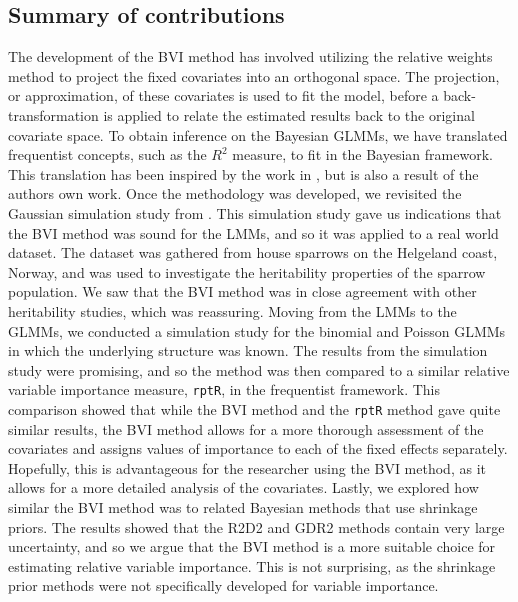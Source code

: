 \subsection*{Summary of contributions}
The development of the BVI method has involved utilizing the relative weights method \citep{johnson_relative_weights} to project the fixed covariates into an orthogonal space. The projection, or approximation, of these covariates is used to fit the model, before a back-transformation is applied to relate the estimated results back to the original covariate space. To obtain inference on the Bayesian GLMMs, we have translated frequentist concepts, such as the $R^2$ measure, to fit in the Bayesian framework. This translation has been inspired by the work in \citet{gelman2017rsquared}, but is also a result of the authors own work. 
Once the methodology was developed, we revisited the Gaussian simulation study from \citet{Arnstad:Relative_variable_importance_in_Bayesian_linear_mixed_models:2024}. This simulation study gave us indications that the BVI method was sound for the LMMs, and so it was applied to a real world dataset. The dataset was gathered from house sparrows on the Helgeland coast, Norway, and was used to investigate the heritability properties of the sparrow population. We saw that the BVI method was in close agreement with other heritability studies, which was reassuring. Moving from the LMMs to the GLMMs, we conducted a simulation study for the binomial and Poisson GLMMs in which the underlying structure was known. The results from the simulation study were promising, and so the method was then compared to a similar relative variable importance measure, \texttt{rptR}, in the frequentist framework. This comparison showed that while the BVI method and the \texttt{rptR} method gave quite similar results, the BVI method allows for a more thorough assessment of the covariates and assigns values of importance to each of the fixed effects separately. Hopefully, this is advantageous for the researcher using the BVI method, as it allows for a more detailed analysis of the covariates. Lastly, we explored how similar the BVI method was to related Bayesian methods that use shrinkage priors. The results showed that the R2D2 and GDR2 methods contain very large uncertainty, and so we argue that the BVI method is a more suitable choice for estimating relative variable importance. This is not surprising, as the shrinkage prior methods were not specifically developed for variable importance. 
